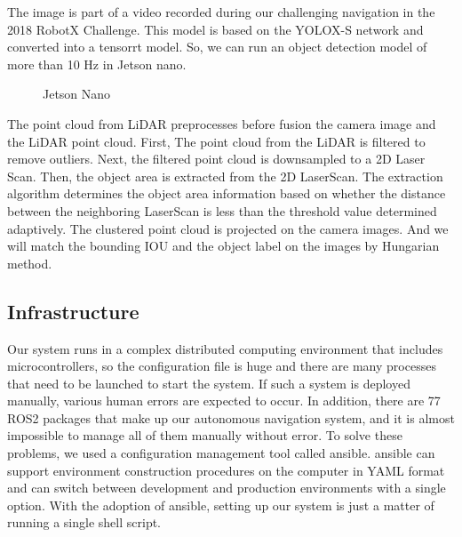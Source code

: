 \documentclass[lettersize,journal]{IEEEtran}
\begin{document}
The image is part of a video recorded during our challenging navigation in the 2018 RobotX Challenge.\cite{RobotX2018_video}
This model is based on the YOLOX-S network and converted into a tensorrt model.
So, we can run an object detection model of more than 10 Hz in Jetson nano.

\begin{figure}[h]
    \begin{center}
  \end{center}
  \caption{Jetson Nano}
  \label{fig:jetson_nano}
\end{figure}

\indent The point cloud from LiDAR preprocesses before fusion the camera image and the LiDAR point cloud.
First, The point cloud from the LiDAR is filtered to remove outliers.
Next, the filtered point cloud is downsampled to a 2D Laser Scan.
Then, the object area is extracted from the 2D LaserScan. \cite{scan_segmentation}
The extraction algorithm determines the object area information based on whether the distance between 
the neighboring LaserScan is less than the threshold value determined adaptively.
The clustered point cloud is projected on the camera images.
And we will match the bounding IOU and the object label on the images by Hungarian method.

\subsection{Infrastructure}
Our system runs in a complex distributed computing environment that includes microcontrollers,
so the configuration file is huge and there are many processes that need to be launched to start the system.
If such a system is deployed manually, various human errors are expected to occur.
In addition, there are 77 ROS2 packages that make up our autonomous navigation system,
and it is almost impossible to manage all of them manually without error.
To solve these problems, we used a configuration management tool called ansible.
ansible can support environment construction procedures on the computer in YAML format and
can switch between development and production environments with a single option.
With the adoption of ansible, setting up our system is just a matter of running a single shell script.
\end{document}
